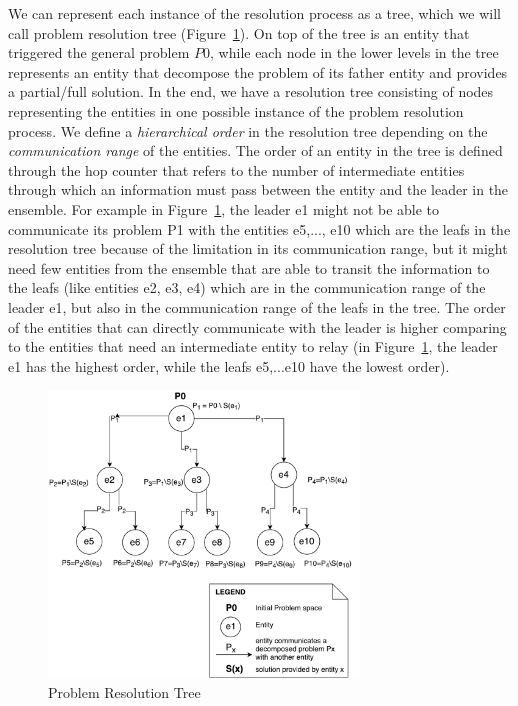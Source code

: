 \documentclass[journal]{IEEEtran}
\theoremstyle{definition}
\begin{document}
We can represent each instance of the resolution process as a tree, which we will call problem resolution tree (Figure~\ref{fig:MissionTree}). On top of the tree is an entity that triggered the general problem $P0$, while each node in the lower levels in the tree represents an entity that decompose the problem of its father entity and provides a partial/full solution. In the end, we have a resolution tree consisting of nodes representing the entities in one possible instance of the problem resolution process. We define a \textit{hierarchical order} in the resolution tree depending on the \textit{communication range} of the entities. The order of an entity in the tree  
is defined through the hop counter that refers to the number of intermediate entities through which an information must pass between the entity and the leader in the ensemble. For example in Figure~\ref{fig:MissionTree}, the leader e1 might not be able to communicate its problem P1 with the entities e5,..., e10 which are the leafs in the resolution tree because of the limitation in its communication range, but it might need few entities from the ensemble that are able to transit the information to the leafs (like entities e2, e3, e4) which are in the communication range of the leader e1, but also in the communication range of the leafs in the tree. The order of the entities that can directly communicate with the leader is higher comparing to the entities that need an intermediate entity to relay (in Figure~\ref{fig:MissionTree}, the leader e1 has the highest order, while the leafs e5,...e10 have the lowest order).

\begin{figure}[h]
\includegraphics[width=3.25in]{Figures/ResolutionTree_FN.pdf}
\caption{Problem Resolution Tree}\label{fig:MissionTree}
\end{figure}
\end{document}
